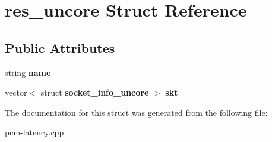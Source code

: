 \section{res\+\_\+uncore Struct Reference}
\label{structres__uncore}
\subsection*{Public Attributes}
\begin{DoxyCompactItemize}
\item 
\mbox{\label{structres__uncore_a19a257608e08741bbb8974a244bfefd7}} 
string {\bfseries name}
\item 
\mbox{\label{structres__uncore_a211d8fc08e67adf68e57d583c4f479f3}} 
vector$<$ struct \textbf{ socket\+\_\+info\+\_\+uncore} $>$ {\bfseries skt}
\end{DoxyCompactItemize}


The documentation for this struct was generated from the following file\+:\begin{DoxyCompactItemize}
\item 
pcm-\/latency.\+cpp\end{DoxyCompactItemize}

